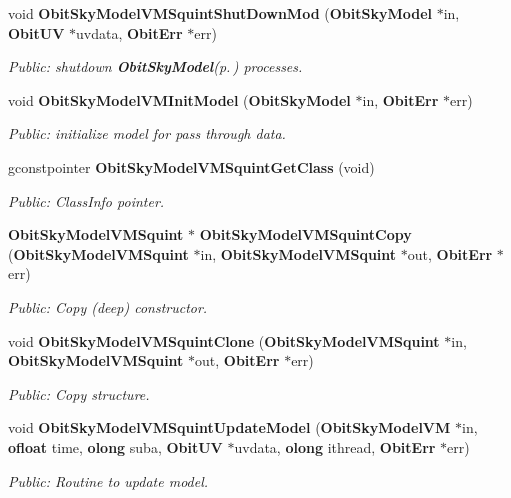 \begin{CompactItemize}
void {\bf Obit\-Sky\-Model\-VMSquint\-Shut\-Down\-Mod} ({\bf Obit\-Sky\-Model} $\ast$in, {\bf Obit\-UV} $\ast$uvdata, {\bf Obit\-Err} $\ast$err)
\begin{CompactList}\small\item\em Public: shutdown {\bf Obit\-Sky\-Model}{\rm (p.\,\pageref{structObitSkyModel})} processes. \item\end{CompactList}\item 
void {\bf Obit\-Sky\-Model\-VMInit\-Model} ({\bf Obit\-Sky\-Model} $\ast$in, {\bf Obit\-Err} $\ast$err)
\begin{CompactList}\small\item\em Public: initialize model for pass through data. \item\end{CompactList}\item 
gconstpointer {\bf Obit\-Sky\-Model\-VMSquint\-Get\-Class} (void)
\begin{CompactList}\small\item\em Public: Class\-Info pointer. \item\end{CompactList}\item 
{\bf Obit\-Sky\-Model\-VMSquint} $\ast$ {\bf Obit\-Sky\-Model\-VMSquint\-Copy} ({\bf Obit\-Sky\-Model\-VMSquint} $\ast$in, {\bf Obit\-Sky\-Model\-VMSquint} $\ast$out, {\bf Obit\-Err} $\ast$err)
\begin{CompactList}\small\item\em Public: Copy (deep) constructor. \item\end{CompactList}\item 
void {\bf Obit\-Sky\-Model\-VMSquint\-Clone} ({\bf Obit\-Sky\-Model\-VMSquint} $\ast$in, {\bf Obit\-Sky\-Model\-VMSquint} $\ast$out, {\bf Obit\-Err} $\ast$err)
\begin{CompactList}\small\item\em Public: Copy structure. \item\end{CompactList}\item 
void {\bf Obit\-Sky\-Model\-VMSquint\-Update\-Model} ({\bf Obit\-Sky\-Model\-VM} $\ast$in, {\bf ofloat} time, {\bf olong} suba, {\bf Obit\-UV} $\ast$uvdata, {\bf olong} ithread, {\bf Obit\-Err} $\ast$err)
\begin{CompactList}\small\item\em Public: Routine to update model. \item\end{CompactList}\item 

\end{CompactItemize}
